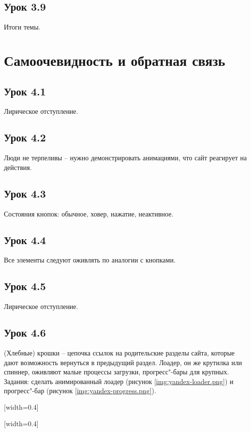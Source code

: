 \documentclass[variant=practice]{bsuir}
\begin{document}
\subsection{Урок 3.9} Итоги темы.

\section{Самоочевидность и обратная связь}

\subsection{Урок 4.1} Лирическое отступление.

\subsection{Урок 4.2} Люди не терпеливы -- нужно демонстрировать анимациями, что
сайт реагирует на действия.

\subsection{Урок 4.3} Состояния кнопок: обычное, ховер, нажатие, неактивное.

\subsection{Урок 4.4} Все элементы следуют оживлять по аналогии с кнопками.

\subsection{Урок 4.5} Лирическое отступление.

\subsection{Урок 4.6} (Хлебные) крошки -- цепочка ссылок на родительские разделы
сайта, которые дают возможность вернуться в предыдущий раздел. Лоадер, он же
крутилка или спиннер, оживляют малые процессы загрузки, прогресс"-бары для
крупных. Задания: сделать анимированный лоадер (рисунок
\ref{img:yandex-loader.png}) и прогресс"-бар (рисунок
\ref{img:yandex-progress.png}).

[width=0.4\textwidth]

[width=0.4\textwidth]
\end{document}
